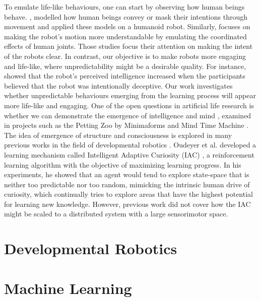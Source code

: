 To emulate life-like behaviours, one can start by observing how human beings behave. \cite{Dragan2015}, \cite{AncaDraga2014} modelled how human beings convey or mask their intentions through movement and applied these models on a humanoid robot. Similarly, \cite{Gielniak2013} focuses on making the robot's motion more understandable by emulating the coordinated effects of human joints. Those studies focus their attention on making the intent of the robots clear. In contrast, our objective is to make robots more engaging and life-like, where unpredictability might be a desirable quality. For instance, \cite{AncaDraga2014} showed that the robot's perceived intelligence increased when the participants believed that the robot was intentionally deceptive. Our work investigates whether unpredictable behaviours emerging from the learning process will appear more life-like and engaging.
One of the open questions in artificial life research is whether we can demonstrate the emergence of intelligence and mind \cite{Bedau2000}, examined in projects such as the Petting Zoo by Minimaforms \cite{Minimaforms} and Mind Time Machine \cite{Ikegami2013}.   The idea of emergence of structure and consciousness is explored in many previous works in the field of developmental robotics \cite{Lungarella2003} \cite{Asada2009} \cite{Kompella2014}.  Oudeyer et al. developed a learning mechanism called Intelligent Adaptive Curiosity (IAC) \cite{Oudeyer2007}, a reinforcement learning algorithm with the objective of maximizing learning progress. In his experiments, he showed that an agent would tend to explore state-space that is neither too predictable nor too random, mimicking the intrinsic human drive of curiosity, which continually tries to explore areas that have the highest potential for learning new knowledge. However, previous work did not cover how the IAC might be scaled to a distributed system with a large sensorimotor space. 




\section{Developmental Robotics}

\section{Machine Learning}


